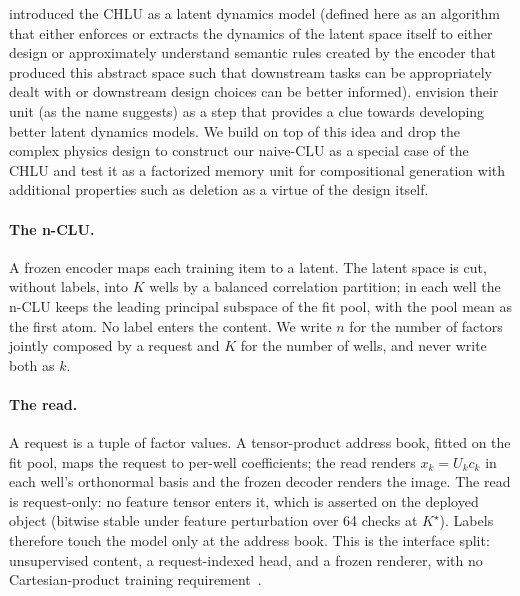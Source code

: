 \documentclass{article} %
\newcommand{\Kstar}{\ensuremath{K^{\star}}}
\begin{document}
\citet{jawahar2026chlu} introduced the CHLU as a latent dynamics model (defined here as an algorithm
that either enforces or extracts the dynamics of the latent space itself to either design or
approximately understand semantic rules created by the encoder that produced this abstract space
such that downstream tasks can be appropriately dealt with or downstream design choices can be
better informed). \citet{jawahar2026chlu} envision their unit (as the name suggests) as a step that
provides a clue towards developing better latent dynamics models. We build on top of this idea and
drop the complex physics design to construct our naive-CLU as a special case of the CHLU and test it
as a factorized memory unit for compositional generation with additional properties such as deletion
as a virtue of the design itself.

\paragraph{The n-CLU.} A frozen encoder maps each training item to a latent. The latent
space is cut, without labels, into $K$ wells by a balanced correlation partition; in each well
the n-CLU keeps the leading principal subspace of the fit pool, with the pool mean as the
first atom. No label enters the content. We write $n$ for the number of factors jointly
composed by a request and $K$ for the number of wells, and never write both as $k$.

\paragraph{The read.} A request is a tuple of factor values. A tensor-product address book,
fitted on the fit pool, maps the request to per-well coefficients; the read renders
$x_k=U_k c_k$ in each well's orthonormal basis and the frozen decoder renders the image. The
read is request-only: no feature tensor enters it, which is asserted on the deployed object
(bitwise stable under feature perturbation over 64 checks at $\Kstar$).
Labels therefore touch the model only at the address book. This is the interface split:
unsupervised content, a request-indexed head, and a frozen renderer, with no Cartesian-product
training requirement~\citep{wiedemer_compositional_2023,lachapelle_additive_2023,montero_lost_2022}.
\end{document}
